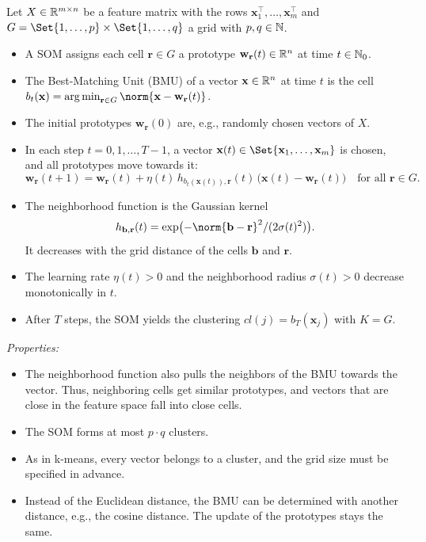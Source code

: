 \begin{definition}
	\label{def:prelim:som}
	Let $X \in \mathbb R^{m \times n}$ be a feature matrix with the rows $\mathbf{x}_1^\top, \dots, \mathbf{x}_m^\top$ and $G = \Set{1, \dots, p} \times \Set{1, \dots, q}$ a grid with $p, q \in \mathbb N$.
	\begin{itemize}
		\item A SOM assigns each cell $\mathbf{r} \in G$ a prototype $\mathbf{w}_{\mathbf{r}}(t) \in \mathbb R^n$ at time $t \in \mathbb N_0$.
		\item The Best-Matching Unit (BMU) of a vector $\mathbf{x} \in \mathbb R^n$ at time $t$ is the cell $b_t(\mathbf{x}) = \argmin_{\mathbf{r} \in G} \norm{\mathbf{x} - \mathbf{w}_{\mathbf{r}}(t)}$.
		\item The initial prototypes $\mathbf{w}_{\mathbf{r}}(0)$ are, e.g., randomly chosen vectors of $X$.
		\item In each step $t = 0, 1, \dots, T - 1$, a vector $\mathbf{x}(t) \in \Set{\mathbf{x}_1, \dots, \mathbf{x}_m}$ is chosen, and all prototypes move towards it:
		      \[
			      \mathbf{w}_{\mathbf{r}}(t + 1) = \mathbf{w}_{\mathbf{r}}(t) + \eta(t) \, h_{b_t(\mathbf{x}(t)), \mathbf{r}}(t) \, \bigl(\mathbf{x}(t) - \mathbf{w}_{\mathbf{r}}(t)\bigr) \quad \text{for all } \mathbf{r} \in G.
		      \]
		\item The neighborhood function is the Gaussian kernel
		      \[
			      h_{\mathbf{b}, \mathbf{r}}(t) = \exp\bigl(-\norm{\mathbf{b} - \mathbf{r}}^2 / (2 \sigma(t)^2)\bigr).
		      \]
		      It decreases with the grid distance of the cells $\mathbf{b}$ and $\mathbf{r}$.
		\item The learning rate $\eta(t) > 0$ and the neighborhood radius $\sigma(t) > 0$ decrease monotonically in $t$.
		\item After $T$ steps, the SOM yields the clustering $\mathit{cl}(j) = b_T(\mathbf{x}_j)$ with $K = G$.
	\end{itemize}
\end{definition}

\noindent\emph{Properties:}
\begin{itemize}[beginpenalty=10000]
	\item The neighborhood function also pulls the neighbors of the BMU towards the vector. Thus, neighboring cells get similar prototypes, and vectors that are close in the feature space fall into close cells.
	\item The SOM forms at most $p \cdot q$ clusters.
	\item As in k-means, every vector belongs to a cluster, and the grid size must be specified in advance.
	\item Instead of the Euclidean distance, the BMU can be determined with another distance, e.g., the cosine distance. The update of the prototypes stays the same.
\end{itemize}


